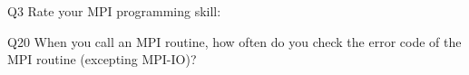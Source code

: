 \begin{description}%
\item{Q3} Rate your MPI programming skill:%
\item{Q20} When you call an MPI routine, how often do you check the error code of the MPI routine  (excepting MPI-IO)?%
\end{description}%
